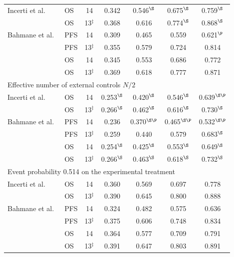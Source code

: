 \begin{table}[!htb]
\begin{tabular}{llccccc}
\quad Incerti et al.~\cite{Incerti2023} & OS & 14 & 0.342 & 0.546$^{\S}$ & 0.675$^{\S}$ & 0.759$^{\S}$ \\
 & OS & 13$^{\ddagger}$ & 0.368 & 0.616 & 0.774$^{\S}$ & 0.868$^{\S}$ \\
\quad Bahmane et al.~\cite{Bahmane2025} & PFS & 14 & 0.309 & 0.465 & 0.559 & 0.621$^{\P}$ \\
 & PFS & 13$^{\ddagger}$ & 0.355 & 0.579 & 0.724 & 0.814 \\
 & OS & 14 & 0.345 & 0.553 & 0.686 & 0.772 \\
 & OS & 13$^{\ddagger}$ & 0.369 & 0.618 & 0.777 & 0.871 \\
\multicolumn{7}{l}{Effective number of external controls $N/2$} \\
\quad Incerti et al.~\cite{Incerti2023} & OS & 14 & 0.253$^{\S}$ & 0.420$^{\S}$ & 0.546$^{\S}$ & 0.639$^{\S\P}$ \\
 & OS & 13$^{\ddagger}$ & 0.266$^{\S}$ & 0.462$^{\S}$ & 0.616$^{\S}$ & 0.730$^{\S}$ \\
\quad Bahmane et al.~\cite{Bahmane2025} & PFS & 14 & 0.236 & 0.370$^{\S\P}$ & 0.465$^{\S\P}$ & 0.532$^{\S\P}$ \\
 & PFS & 13$^{\ddagger}$ & 0.259 & 0.440 & 0.579 & 0.683$^{\S}$ \\
 & OS & 14 & 0.254$^{\S}$ & 0.425$^{\S}$ & 0.553$^{\S}$ & 0.649$^{\S}$ \\
 & OS & 13$^{\ddagger}$ & 0.266$^{\S}$ & 0.463$^{\S}$ & 0.618$^{\S}$ & 0.732$^{\S}$ \\
\multicolumn{7}{l}{Event probability 0.514 on the experimental treatment} \\
\quad Incerti et al.~\cite{Incerti2023} & OS & 14 & 0.360 & 0.569 & 0.697 & 0.778 \\
 & OS & 13$^{\ddagger}$ & 0.390 & 0.645 & 0.800 & 0.888 \\
\quad Bahmane et al.~\cite{Bahmane2025} & PFS & 14 & 0.324 & 0.482 & 0.575 & 0.636 \\
 & PFS & 13$^{\ddagger}$ & 0.375 & 0.606 & 0.748 & 0.834 \\
 & OS & 14 & 0.364 & 0.577 & 0.709 & 0.791 \\
 & OS & 13$^{\ddagger}$ & 0.391 & 0.647 & 0.803 & 0.891 \\
\bottomrule
\end{tabular}
\par\smallskip
\begin{minipage}{0.95\linewidth}
\footnotesize

\end{minipage}
\end{table}
